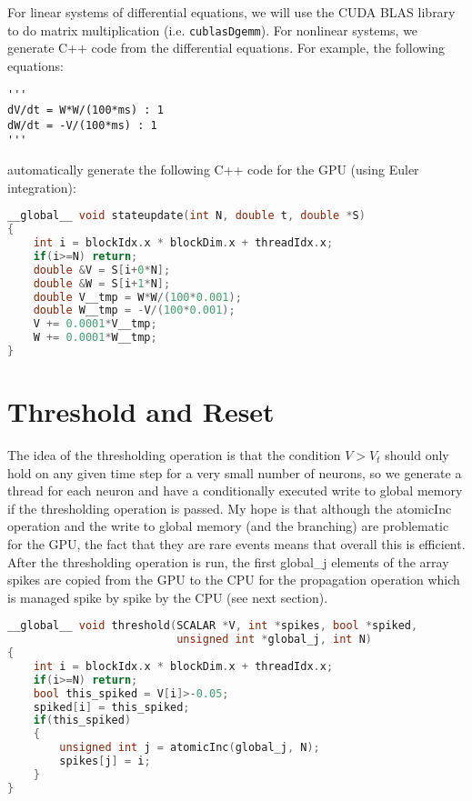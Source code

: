 \documentclass[a4paper]{article}
\newcommand{\code}[1]{\lstinline£#1£}
\begin{document}
For linear systems of differential equations, we will use the CUDA BLAS library to do matrix multiplication (i.e. \code{cublasDgemm}). For nonlinear systems, we generate C++ code from the differential equations. For example, the following equations:

\begin{lstlisting}
'''
dV/dt = W*W/(100*ms) : 1
dW/dt = -V/(100*ms) : 1
'''
\end{lstlisting}

automatically generate the following C++ code for the GPU (using Euler integration):

\begin{lstlisting}[language=C++]
__global__ void stateupdate(int N, double t, double *S)
{
    int i = blockIdx.x * blockDim.x + threadIdx.x;
    if(i>=N) return;
    double &V = S[i+0*N];
    double &W = S[i+1*N];
    double V__tmp = W*W/(100*0.001);
    double W__tmp = -V/(100*0.001);
    V += 0.0001*V__tmp;
    W += 0.0001*W__tmp;
}
\end{lstlisting}

\section{Threshold and Reset}

The idea of the thresholding operation is that the condition $V>V_t$ should only hold on any given time step for a very small number of neurons, so we generate a thread for each neuron and have a conditionally executed write to global memory if the thresholding operation is passed. My hope is that although the atomicInc operation and the write to global memory (and the branching) are problematic for the GPU, the fact that they are rare events means that overall this is efficient. After the thresholding operation is run, the first global\_j elements of the array spikes are copied from the GPU to the CPU for the propagation operation which is managed spike by spike by the CPU (see next section).

\begin{lstlisting}[language=C++]
__global__ void threshold(SCALAR *V, int *spikes, bool *spiked,
                          unsigned int *global_j, int N)
{
    int i = blockIdx.x * blockDim.x + threadIdx.x;
    if(i>=N) return;
    bool this_spiked = V[i]>-0.05; 
    spiked[i] = this_spiked;
    if(this_spiked)
    {
        unsigned int j = atomicInc(global_j, N);
        spikes[j] = i;
    }
}
\end{lstlisting}
\end{document}
